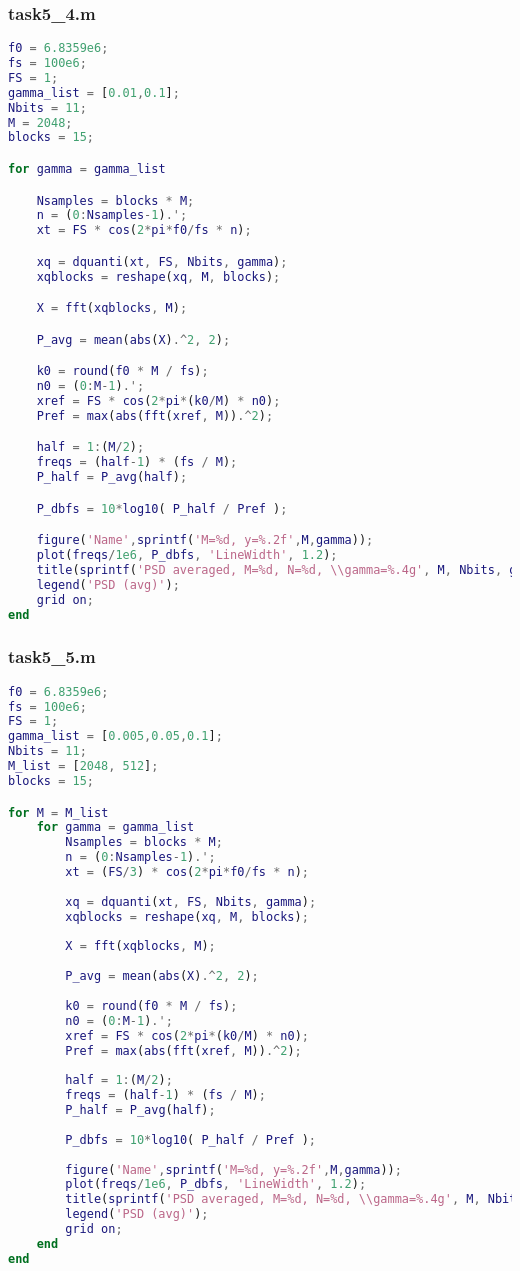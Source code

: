 \subsubsection{task5\_4.m}
\begin{lstlisting}[language=Matlab]
f0 = 6.8359e6;
fs = 100e6;
FS = 1;
gamma_list = [0.01,0.1];
Nbits = 11;
M = 2048;
blocks = 15;

for gamma = gamma_list

    Nsamples = blocks * M;
    n = (0:Nsamples-1).';
    xt = FS * cos(2*pi*f0/fs * n);

    xq = dquanti(xt, FS, Nbits, gamma);
    xqblocks = reshape(xq, M, blocks);

    X = fft(xqblocks, M);

    P_avg = mean(abs(X).^2, 2);

    k0 = round(f0 * M / fs);
    n0 = (0:M-1).';
    xref = FS * cos(2*pi*(k0/M) * n0);
    Pref = max(abs(fft(xref, M)).^2);

    half = 1:(M/2);
    freqs = (half-1) * (fs / M);
    P_half = P_avg(half);

    P_dbfs = 10*log10( P_half / Pref );

    figure('Name',sprintf('M=%d, y=%.2f',M,gamma));
    plot(freqs/1e6, P_dbfs, 'LineWidth', 1.2);
    title(sprintf('PSD averaged, M=%d, N=%d, \\gamma=%.4g', M, Nbits, gamma));
    legend('PSD (avg)');
    grid on;
end

\end{lstlisting}

\subsubsection{task5\_5.m}
\begin{lstlisting}[language=Matlab]
f0 = 6.8359e6;
fs = 100e6;
FS = 1;
gamma_list = [0.005,0.05,0.1];
Nbits = 11;
M_list = [2048, 512];
blocks = 15;

for M = M_list
    for gamma = gamma_list
        Nsamples = blocks * M;
        n = (0:Nsamples-1).';
        xt = (FS/3) * cos(2*pi*f0/fs * n);
    
        xq = dquanti(xt, FS, Nbits, gamma);
        xqblocks = reshape(xq, M, blocks);
    
        X = fft(xqblocks, M);
    
        P_avg = mean(abs(X).^2, 2);
    
        k0 = round(f0 * M / fs);
        n0 = (0:M-1).';
        xref = FS * cos(2*pi*(k0/M) * n0);
        Pref = max(abs(fft(xref, M)).^2);
    
        half = 1:(M/2);
        freqs = (half-1) * (fs / M);
        P_half = P_avg(half);
    
        P_dbfs = 10*log10( P_half / Pref );
    
        figure('Name',sprintf('M=%d, y=%.2f',M,gamma));
        plot(freqs/1e6, P_dbfs, 'LineWidth', 1.2);
        title(sprintf('PSD averaged, M=%d, N=%d, \\gamma=%.4g', M, Nbits, gamma));
        legend('PSD (avg)');
        grid on;
    end
end
\end{lstlisting}

